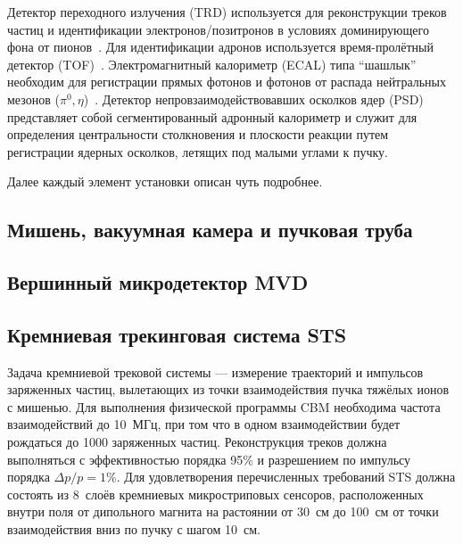 Детектор переходного излучения (TRD) используется для реконструкции треков частиц и идентификации электронов/позитронов в условиях доминирующего фона от пионов~\cite{TRD}. Для идентификации адронов используется время-пролётный детектор (TOF)~\cite{TDR_TOF}. Электромагнитный калориметр (ECAL) типа ``шашлык'' необходим для регистрации прямых фотонов и фотонов от распада нейтральных мезонов ($ \pi^{0}, \eta $)~\cite{ECAL_KOROLKO}. Детектор непровзаимодействовавших осколков ядер (PSD)~\cite{TDR_PSD} представляет собой сегментированный адронный калориметр и служит для определения центральности столкновения и плоскости реакции путем регистрации ядерных осколков, летящих под малыми углами к пучку.

Далее каждый элемент установки описан чуть подробнее.

\subsection{Мишень, вакуумная камера и пучковая труба}\label{sec:secVacChamberPipe}

\subsection{Вершинный микродетектор MVD}\label{sec:secMVD}

\subsection{Кремниевая трекинговая система STS}\label{sec:secSTS}

Задача кремниевой трековой системы --- измерение траекторий и импульсов заряженных частиц, вылетающих из точки взаимодействия пучка тяжёлых ионов с мишенью. Для выполнения физической программы CBM необходима частота взаимодействий до 10~МГц, при том что в одном взаимодействии будет рождаться до 1000 заряженных частиц. Реконструкция треков должна выполняться с эффективностью порядка 95\% и разрешением по импульсу порядка $\Delta p / p = 1\%$. Для удовлетворения перечисленных требований STS должна состоять из 8~слоёв кремниевых микростриповых сенсоров, расположенных внутри поля от дипольного магнита на растоянии от 30~см до 100~см от точки взаимодействия вниз по пучку с шагом 10~см.

